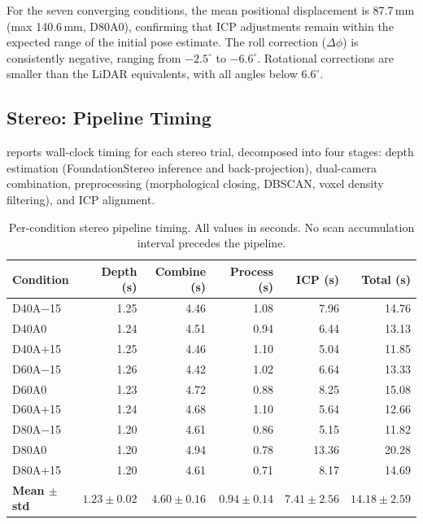 For the seven converging conditions, the mean positional displacement is 87.7\,mm (max 140.6\,mm, D80A0), confirming that ICP adjustments remain within the expected range of the initial pose estimate. The roll correction ($\Delta\phi$) is consistently negative, ranging from $-2.5^{\circ}$ to $-6.6^{\circ}$. Rotational corrections are smaller than the LiDAR equivalents, with all angles below $6.6^{\circ}$.

\subsection{Stereo: Pipeline Timing}
\label{subsec:pa-results-stereo-timing}

 reports wall-clock timing for each stereo trial, decomposed into four stages: depth estimation (FoundationStereo inference and back-projection), dual-camera combination, preprocessing (morphological closing, DBSCAN, voxel density filtering), and ICP alignment.

\begin{table}[htbp]
  \centering
  \small
  \setlength{\tabcolsep}{4pt}
  \caption{Per-condition stereo pipeline timing. All values in seconds. No scan accumulation interval precedes the pipeline.}
  \label{tab:pa-results-stereo-timing}
  \begin{tabular}{@{} l r r r r r @{}}
    \toprule
    \textbf{Condition} &
    \textbf{Depth (s)} &
    \textbf{Combine (s)} &
    \textbf{Process (s)} &
    \textbf{ICP (s)} &
    \textbf{Total (s)} \\
    \midrule
    D40A$-$15 & 1.25 & 4.46 & 1.08 &  7.96 & 14.76 \\
    D40A0     & 1.24 & 4.51 & 0.94 &  6.44 & 13.13 \\
    D40A$+$15 & 1.25 & 4.46 & 1.10 &  5.04 & 11.85 \\
    D60A$-$15 & 1.26 & 4.42 & 1.02 &  6.64 & 13.33 \\
    D60A0     & 1.23 & 4.72 & 0.88 &  8.25 & 15.08 \\
    D60A$+$15 & 1.24 & 4.68 & 1.10 &  5.64 & 12.66 \\
    D80A$-$15 & 1.20 & 4.61 & 0.86 &  5.15 & 11.82 \\
    D80A0     & 1.20 & 4.94 & 0.78 & 13.36 & 20.28 \\
    D80A$+$15 & 1.20 & 4.61 & 0.71 &  8.17 & 14.69 \\
    \midrule
    \textbf{Mean $\pm$ std} & $1.23 \pm 0.02$ & $4.60 \pm 0.16$ & $0.94 \pm 0.14$ & $7.41 \pm 2.56$ & $14.18 \pm 2.59$ \\
    \bottomrule
  \end{tabular}
\end{table}

